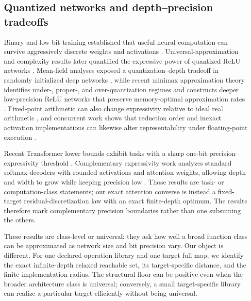 \documentclass[twoside,11pt]{article}
\begin{document}
\subsection{Quantized networks and depth--precision tradeoffs}

Binary and low-bit training established that useful neural computation can survive aggressively discrete weights and activations \citep{CourbariauxBengioDavid2015,HubaraEtAl2018,RastegariEtAl2016}.  Universal-approximation and complexity results later quantified the expressive power of quantized ReLU networks \citep{DingEtAl2019}.  Mean-field analyses exposed a quantization--depth tradeoff in randomly initialized deep networks \citep{BlumenfeldGilboaSoudry2019}, while recent minimax approximation theory identifies under-, proper-, and over-quantization regimes and constructs deeper low-precision ReLU networks that preserve memory-optimal approximation rates \citep{OuSchenkelBolcskei2024}.  Fixed-point arithmetic can also change expressivity relative to ideal real arithmetic \citep{HwangParkPark2024FixedPoint}, and concurrent work shows that reduction order and inexact activation implementations can likewise alter representability under floating-point execution \citep{ParkEtAl2026FloatingPoint}.

Recent Transformer lower bounds exhibit tasks with a sharp one-bit precision--expressivity threshold \citep{ChakrabartiPitassiAlman2026}.  Complementary expressivity work analyzes standard softmax decoders with rounded activations and attention weights, allowing depth and width to grow while keeping precision low \citep{BroesamleEckstein2026LowPrecisionSoftmax}.  Those results are task- or computation-class statements; our exact attention converse is instead a fixed-target residual-discretization law with an exact finite-depth optimum.  The results therefore mark complementary precision boundaries rather than one subsuming the others.

These results are class-level or universal: they ask how well a broad function class can be approximated as network size and bit precision vary.  Our object is different.  For one declared operation library and one target full map, we identify the exact infinite-depth relaxed reachable set, its target-specific distance, and the finite implementation radius.  The structural floor can be positive even when the broader architecture class is universal; conversely, a small target-specific library can realize a particular target efficiently without being universal.
\end{document}
